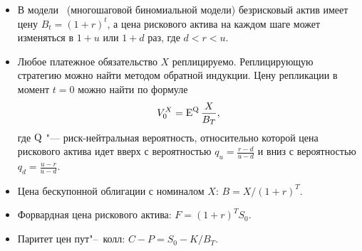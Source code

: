 \summary

\begin{itemize}
\item В модели \crr\ (многошаговой биномиальной модели) безрисковый актив имеет цену $B_t=(1+r)^t$, а цена рискового актива на каждом шаге может изменяться в $1+u$ или $1+d$ раз, где $d<r<u$.

\item Любое платежное обязательство $X$ реплицируемо.
Реплицирующую стратегию можно найти методом обратной индукции.
Цену репликации в момент $t=0$ можно найти по формуле
\[
V^X_0 = \operatorname{E}^{\mathrm{Q}} \frac{X}{B_T},
\]
где $\mathrm{Q}$ "--- риск-нейтральная вероятность, относительно которой цена рискового актива идет вверх с вероятностью $q_u = \frac{r-d}{u-d}$ и вниз с вероятностью $q_d = \frac{u-r}{u-d}$.

\item Цена бескупонной облигации с номиналом $X$: $B = X/(1+r)^T$.

\item Форвардная цена рискового актива: $F=(1+r)^TS_0$.

\item Паритет цен пут"--~колл: $C-P = S_0 - K/B_T$.
\end{itemize}
